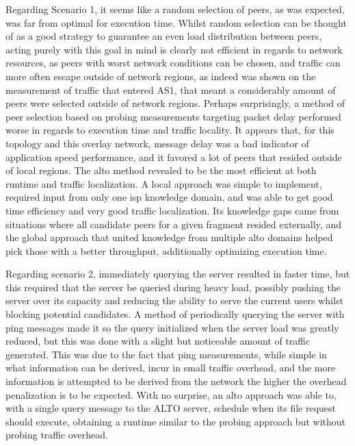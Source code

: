     Regarding Scenario 1, it seems like a random selection of peers, as was expected, was far from optimal for execution time. 
    Whilst random selection can be thought of as a good strategy to guarantee an even load distribution between peers, acting purely with this goal in mind is clearly not efficient in regards to network resources, as peers with worst network conditions can be chosen, and traffic can more often escape outside of network regions, as indeed was shown on the measurement of traffic that entered AS1, that meant a considerably amount of peers were selected outside of network regions. 
    Perhaps surprisingly, a method of peer selection based on probing measurements targeting packet delay performed worse in regards to execution time and traffic locality.
    It appears that, for this topology and this overlay network, message delay was a bad indicator of application speed performance, and it favored a lot of peers that resided outside of local regions.
    The \gls{alto} method revealed to be the most efficient at both runtime and traffic localization.
    A local approach was simple to implement, required input from only one \gls{isp} knowledge domain, and was able to get good time efficiency and very good traffic localization.
    Its knowledge gaps came from situations where all candidate peers for a given fragment resided externally, and the global approach that united knowledge from multiple \gls{alto} domains helped pick those with a better throughput, additionally optimizing execution time.

    Regarding scenario 2, immediately querying the server resulted in faster time, but this required that the server be queried during heavy load, possibly pushing the server over its capacity and reducing the ability to serve the current users whilst blocking potential candidates.
    A method of periodically querying the server with ping messages made it so the query initialized when the server load was greatly reduced, but this was done with a slight but noticeable amount of traffic generated.
    This was due to the fact that ping measurements, while simple in what information can be derived, incur in small traffic overhead, and the more information is attempted to be derived from the network the higher the overhead penalization is to be expected.
    With no surprise, an \gls{alto} approach was able to, with a single query message to the ALTO server, schedule when its file request should execute, obtaining a runtime similar to the probing approach but without probing traffic overhead.

